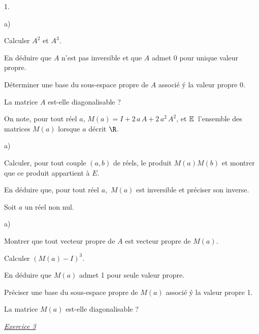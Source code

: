 \documentclass[11pt]{article}%
\begin{document}
\begin{noliste}{1.}
 \setlength{\itemsep}{4mm}
\item 
\begin{noliste}{a)}
 \setlength{\itemsep}{2mm}
\item Calculer $A^{2}$ et $A^{3}$.

\item En déduire que $A$ n'est pas inversible et que $A$ admet $0$ pour
unique valeur propre.

\item Déterminer une base du sous-espace propre de $A$ associé \'{y}
la valeur propre $0$.

\item La matrice $A$ est-elle diagonalisable ?
\end{noliste}

\item On note, pour tout réel $a$, $M(a) = I + 2\,a\,A +
2\,a^{2}\,A^{2}$, et 
$\mathbb{E}\,$ l'ensemble des matrices $M(a)$ lorsque $a$ décrit $\R$.

\begin{noliste}{a)}
 \setlength{\itemsep}{2mm}
\item Calculer, pour tout couple $(a,b)$ de réels, le produit
$M(a)M(b)$
et montrer que ce produit appartient à $E$.

\item En déduire que, pour tout réel $a$, $\,M(a)$ est inversible
et préciser son inverse.
\end{noliste}

\item Soit $a$ un réel non nul.

\begin{noliste}{a)}
 \setlength{\itemsep}{2mm}
\item Montrer que tout vecteur propre de $A$ est vecteur propre de
$M(a)$.

\item Calculer $\left( M(a)-I\right) ^{3}$.

En déduire que $M(a)$ admet 1 pour seule valeur propre.

Préciser une base du sous-espace propre de $M(a)$ associé \'{y} la
valeur propre 1.

\item La matrice $M(a)$ est-elle diagonalisable ?
\end{noliste}
\end{noliste}

\newpage 

\begin{center}
{\large \textsl{\underline{Exercice 3}}}
\end{center}
\end{document}
